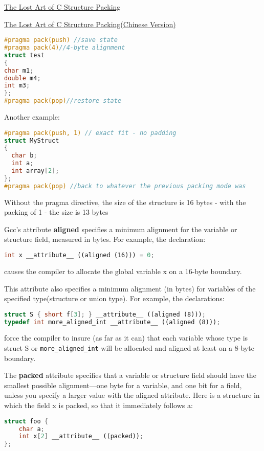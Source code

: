 \href{http://www.catb.org/esr/structure-packing/}{The Lost Art of C Structure Packing}

\href{https://github.com/ludx/The-Lost-Art-of-C-Structure-Packing/blob/master/README.md}{The Lost Art of C Structure Packing(Chinese Version)}



\begin{lstlisting}[language=C++]
#pragma pack(push) //save state
#pragma pack(4)//4-byte alignment
struct test
{
char m1;
double m4;
int m3;
};
#pragma pack(pop)//restore state

\end{lstlisting}

Another example:
\begin{lstlisting}[language=C++]
#pragma pack(push, 1) // exact fit - no padding
struct MyStruct
{
  char b; 
  int a; 
  int array[2];
};
#pragma pack(pop) //back to whatever the previous packing mode was

\end{lstlisting}
Without the pragma directive, the size of the structure is 16 bytes - with the packing of 1 - the size is 13 bytes

Gcc's attribute \textbf{aligned} specifies a minimum alignment for the variable
or structure field, measured in bytes. For example, the declaration: 
\begin{lstlisting}[language=C++]
int x __attribute__ ((aligned (16))) = 0;
\end{lstlisting}
causes the compiler to allocate the global variable x on a 16-byte boundary.

This attribute also specifies a minimum alignment (in bytes) for variables of
the specified type(structure or union type). For example, the declarations:
\begin{lstlisting}[language=C++]
struct S { short f[3]; } __attribute__ ((aligned (8)));
typedef int more_aligned_int __attribute__ ((aligned (8)));
\end{lstlisting}
force the compiler to insure (as far as it can) that each variable whose type is struct S or \verb|more_aligned_int| will be allocated and aligned at least on a 8-byte boundary.

The \textbf{packed} attribute specifies that a variable or structure field
should have the smallest possible alignment—one byte for a variable, and one bit for a field, unless you specify a larger value with the aligned attribute.
Here is a structure in which the field x is packed, so that it immediately follows a:

\begin{lstlisting}[language=C++]
struct foo {
    char a;
    int x[2] __attribute__ ((packed));
};
\end{lstlisting}




